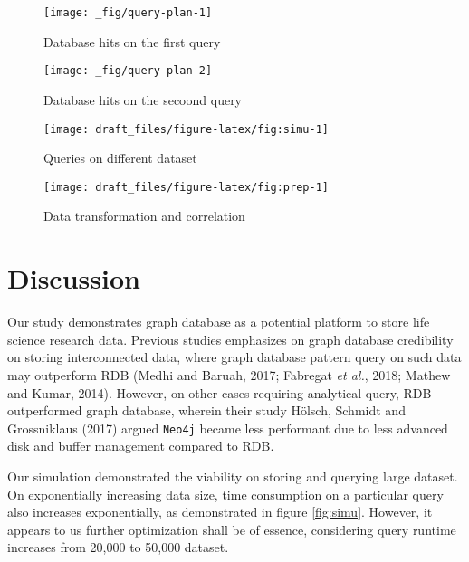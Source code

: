 \documentclass[]{article}
\begin{document}
\begin{figure}

{\centering \texttt{[image: \_fig/query-plan-1]} 

}

\caption{\label{fig:dbhits1} Database hits on the first query}\label{fig:fig:dbhits1}
\end{figure}

\begin{figure}

{\centering \texttt{[image: \_fig/query-plan-2]} 

}

\caption{\label{fig:dbhits2} Database hits on the secoond query}\label{fig:fig:dbhits2}
\end{figure}

\begin{figure}

{\centering \texttt{[image: draft\_files/figure-latex/fig:simu-1]} 

}

\caption{\label{fig:simu} Queries on different dataset}\label{fig:fig:simu}
\end{figure}

\begin{figure}

{\centering \texttt{[image: draft\_files/figure-latex/fig:prep-1]} 

}

\caption{\label{fig:prep} Data transformation and correlation}\label{fig:fig:prep}
\end{figure}

\hypertarget{discussion}{%
\section{Discussion}\label{discussion}}

Our study demonstrates graph database as a potential platform to store
life science research data. Previous studies emphasizes on graph
database credibility on storing interconnected data, where graph
database pattern query on such data may outperform RDB (Medhi and
Baruah, 2017; Fabregat \emph{et al.}, 2018; Mathew and Kumar, 2014).
However, on other cases requiring analytical query, RDB outperformed
graph database, wherein their study Hölsch, Schmidt and Grossniklaus
(2017) argued \texttt{Neo4j} became less performant due to less advanced
disk and buffer management compared to RDB.

Our simulation demonstrated the viability on storing and querying large
dataset. On exponentially increasing data size, time consumption on a
particular query also increases exponentially, as demonstrated in figure
\ref{fig:simu}. However, it appears to us further optimization shall be
of essence, considering query runtime increases from 20,000 to 50,000
dataset.
\end{document}
